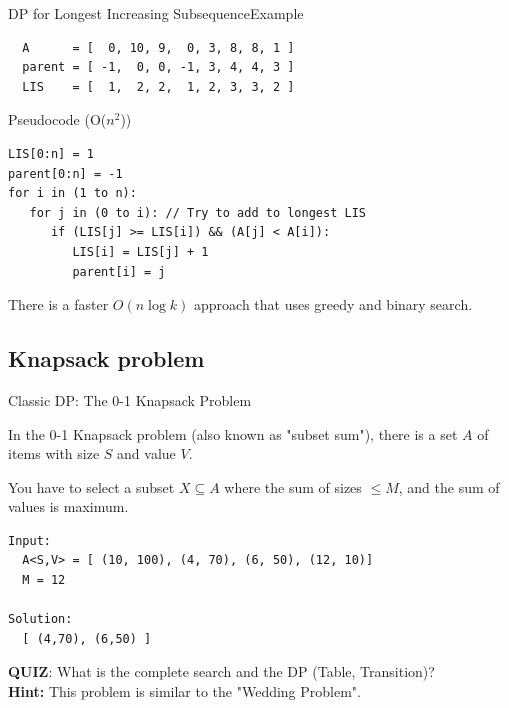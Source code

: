 \begin{frame}[fragile]{DP for Longest Increasing Subsequence}{Example}
\begin{verbatim}
  A      = [  0, 10, 9,  0, 3, 8, 8, 1 ]
  parent = [ -1,  0, 0, -1, 3, 4, 4, 3 ]
  LIS    = [  1,  2, 2,  1, 2, 3, 3, 2 ]
\end{verbatim}

\begin{block}{Pseudocode (O($n^2$))}
\begin{verbatim}
LIS[0:n] = 1
parent[0:n] = -1
for i in (1 to n):
   for j in (0 to i): // Try to add to longest LIS
      if (LIS[j] >= LIS[i]) && (A[j] < A[i]):
         LIS[i] = LIS[j] + 1
         parent[i] = j
\end{verbatim}
\end{block}

There is a faster $O(n\log k)$ approach that uses greedy and binary search.
\end{frame}


\subsection{Knapsack problem}
\begin{frame}[fragile]{Classic DP: The 0-1 Knapsack Problem}

  In the 0-1 Knapsack problem (also known as "subset sum"), there is a set $A$ of items with size $S$ and value $V$.\bigskip

  You have to select a subset $X \subseteq A$ where the sum of sizes $ \leq M$, and the sum of values is maximum.\bigskip

\begin{verbatim}
Input:
  A<S,V> = [ (10, 100), (4, 70), (6, 50), (12, 10)]
  M = 12

Solution:
  [ (4,70), (6,50) ]
\end{verbatim}\bigskip

{\bf QUIZ}: What is the complete search and the DP (Table, Transition)?\\
{\bf Hint:} This problem is similar to the "Wedding Problem".
\end{frame}

